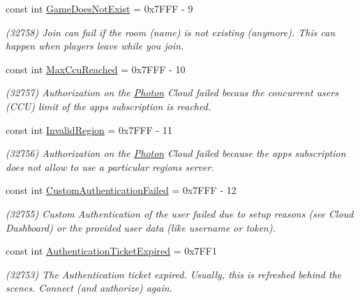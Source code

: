 \begin{DoxyCompactItemize}
const int \hyperlink{class_exit_games_1_1_client_1_1_photon_1_1_error_code_a06604e183d66776a53c489908f7126e0}{Game\+Does\+Not\+Exist} = 0x7\+F\+F\+F -\/ 9
\begin{DoxyCompactList}\small\item\em (32758) Join can fail if the room (name) is not existing (anymore). This can happen when players leave while you join.\end{DoxyCompactList}\item 
const int \hyperlink{class_exit_games_1_1_client_1_1_photon_1_1_error_code_a7c5d773fe68373e9783828697d174d60}{Max\+Ccu\+Reached} = 0x7\+F\+F\+F -\/ 10
\begin{DoxyCompactList}\small\item\em (32757) Authorization on the \hyperlink{namespace_exit_games_1_1_client_1_1_photon}{Photon} Cloud failed becaus the concurrent users (C\+CU) limit of the app\textquotesingle{}s subscription is reached. \end{DoxyCompactList}\item 
const int \hyperlink{class_exit_games_1_1_client_1_1_photon_1_1_error_code_ab6f8b7f747bbd61aa8e9853c2a4194f6}{Invalid\+Region} = 0x7\+F\+F\+F -\/ 11
\begin{DoxyCompactList}\small\item\em (32756) Authorization on the \hyperlink{namespace_exit_games_1_1_client_1_1_photon}{Photon} Cloud failed because the app\textquotesingle{}s subscription does not allow to use a particular region\textquotesingle{}s server. \end{DoxyCompactList}\item 
const int \hyperlink{class_exit_games_1_1_client_1_1_photon_1_1_error_code_a6b1fa4a285add5e81b8bda9dd343e215}{Custom\+Authentication\+Failed} = 0x7\+F\+F\+F -\/ 12
\begin{DoxyCompactList}\small\item\em (32755) Custom Authentication of the user failed due to setup reasons (see Cloud Dashboard) or the provided user data (like username or token). \end{DoxyCompactList}\item 
const int \hyperlink{class_exit_games_1_1_client_1_1_photon_1_1_error_code_a47cd3a6d5d9453e152026f3c9cec5a89}{Authentication\+Ticket\+Expired} = 0x7\+F\+F1
\begin{DoxyCompactList}\small\item\em (32753) The Authentication ticket expired. Usually, this is refreshed behind the scenes. Connect (and authorize) again.\end{DoxyCompactList}\item 

\end{DoxyCompactItemize}
